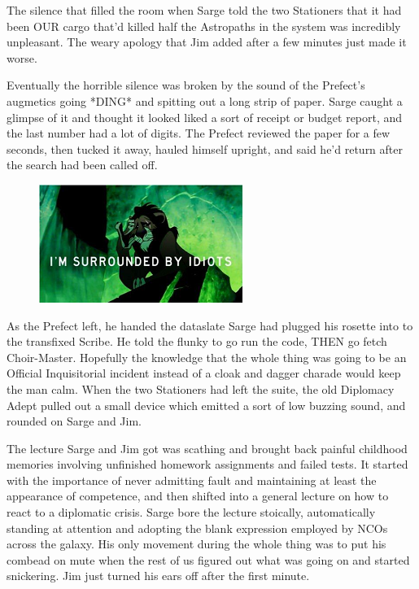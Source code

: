 The silence that filled the room when Sarge told the two Stationers that it had been OUR cargo that'd killed half the Astropaths in the system was incredibly unpleasant. 
The weary apology that Jim added after a few minutes just made it worse. 


Eventually the horrible silence was broken by the sound of the Prefect's augmetics going *DING* and spitting out a long strip of paper. 
Sarge caught a glimpse of it and thought it looked liked a sort of receipt or budget report, and the last number had a lot of digits. 
The Prefect reviewed the paper for a few seconds, then tucked it away, hauled himself upright, and said he'd return after the search had been called off.

\begin{figure}
	\begin{center}
		\includegraphics[width=\figwidth]{pics/14/14.png}
	\end{center}
\end{figure}
As the Prefect left, he handed the dataslate Sarge had plugged his rosette into to the transfixed Scribe. 
He told the flunky to go run the code, THEN go fetch Choir-Master. 
Hopefully the knowledge that the whole thing was going to be an Official Inquisitorial incident instead of a cloak and dagger charade would keep the man calm. 
When the two Stationers had left the suite, the old Diplomacy Adept pulled out a small device which emitted a sort of low buzzing sound, and rounded on Sarge and Jim.

The lecture Sarge and Jim got was scathing and brought back painful childhood memories involving unfinished homework assignments and failed tests. 
It started with the importance of never admitting fault and maintaining at least the appearance of competence, and then shifted into a general lecture on how to react to a diplomatic crisis. 
Sarge bore the lecture stoically, automatically standing at attention and adopting the blank expression employed by NCOs across the galaxy. 
His only movement during the whole thing was to put his combead on mute when the rest of us figured out what was going on and started snickering. 
Jim just turned his ears off after the first minute.

